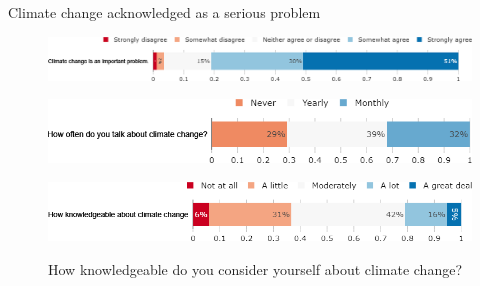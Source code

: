 \begin{framefont}{\small}
\begin{frame}{Climate change acknowledged as a serious problem}%
\begin{figure}[h!]
\centering
\caption{Do you agree or disagree with the following statement: ``Climate change is an important problem."}
\includegraphics[width=.78\paperwidth]{../figures/FR/CC_problem_FR.png}
\caption{How often do you think or talk with people about climate change?}
\includegraphics[width=.61\paperwidth]{../figures/FR/CC_talks_FR.png}\\
\centering
\caption{How knowledgeable do you consider yourself about climate change?}
\includegraphics[width=.7\paperwidth]{../figures/FR/CC_knowledgeable_FR.png}
\\
\end{figure}
\end{frame}


\end{framefont}
